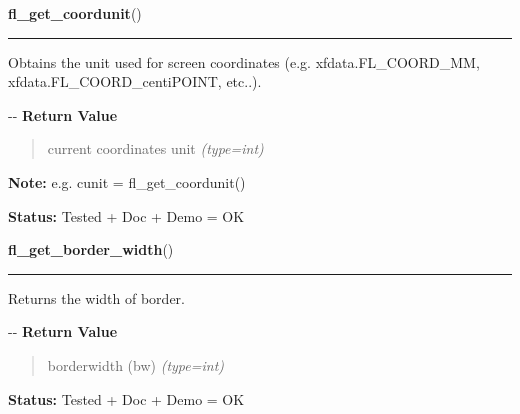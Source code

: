     \label{xformslib:flbasic:fl_get_coordunit}

    \vspace{0.5ex}

\hspace{.8\funcindent}\begin{boxedminipage}{\funcwidth}

    \raggedright \textbf{fl\_get\_coordunit}()

    \vspace{-1.5ex}

    \rule{\textwidth}{0.5\fboxrule}
\setlength{\parskip}{2ex}

Obtains the unit used for screen coordinates (e.g. xfdata.FL\_COORD\_MM,
xfdata.FL\_COORD\_centiPOINT, etc..).

-{}-
\setlength{\parskip}{1ex}
      \textbf{Return Value}
    \vspace{-1ex}

      \begin{quote}

current coordinates unit
      {\it (type=int)}

      \end{quote}

\textbf{Note:} 
e.g. cunit = fl\_get\_coordunit()


\textbf{Status:} 
Tested + Doc + Demo = OK


    \end{boxedminipage}

    \label{xformslib:flbasic:fl_get_border_width}

    \vspace{0.5ex}

\hspace{.8\funcindent}\begin{boxedminipage}{\funcwidth}

    \raggedright \textbf{fl\_get\_border\_width}()

    \vspace{-1.5ex}

    \rule{\textwidth}{0.5\fboxrule}
\setlength{\parskip}{2ex}

Returns the width of border.

-{}-
\setlength{\parskip}{1ex}
      \textbf{Return Value}
    \vspace{-1ex}

      \begin{quote}

borderwidth (bw)
      {\it (type=int)}

      \end{quote}

\textbf{Status:} 
Tested + Doc + Demo = OK


    \end{boxedminipage}

